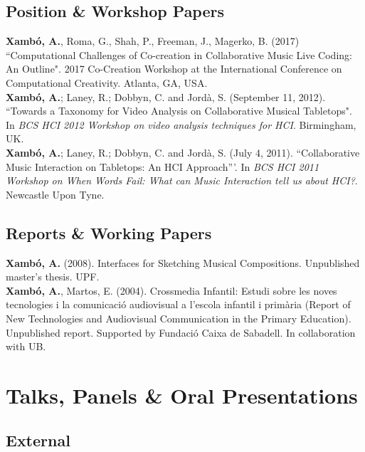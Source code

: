 \documentclass[10pt, a4paper]{article}
\newcommand{\years}[1]{\marginnote{\scriptsize #1}}
\begin{document}
\subsection*{Position \& Workshop Papers}
\noindent

\years{2017}\textbf{Xambó, A.}, Roma, G., Shah, P., Freeman, J., Magerko, B. (2017) “Computational Challenges of Co-creation in Collaborative Music Live Coding: An Outline". 2017 Co-Creation Workshop at the International Conference on Computational Creativity. Atlanta, GA, USA.\\ 
\years{2012}\textbf{Xambó, A.}; Laney, R.; Dobbyn, C. and Jordà, S. (September 11, 2012). “Towards a Taxonomy for Video Analysis on Collaborative Musical Tabletops". In \emph{BCS HCI 2012 Workshop on video analysis techniques for HCI}. Birmingham, UK.\\
\years{2011}\textbf{Xambó, A.}; Laney, R.; Dobbyn, C. and Jordà, S. (July 4, 2011). ``Collaborative Music Interaction on Tabletops: An HCI Approach'''. In \emph{BCS HCI 2011 Workshop on When Words Fail: What can Music Interaction tell us about HCI?}. Newcastle Upon Tyne.\\

\subsection*{Reports \& Working Papers}
\noindent

\years{2008}\textbf{Xambó, A.} (2008). Interfaces for Sketching Musical Compositions. Unpublished master's thesis. UPF.\\ 
\years{2004}\textbf{Xambó, A.}, Martos, E. (2004). Crossmedia Infantil: Estudi sobre les noves tecnologies i la comunicació audiovisual a l'escola infantil i primària (Report of New Technologies and Audiovisual Communication in the Primary Education). Unpublished report. Supported by Fundació Caixa de Sabadell. In collaboration with UB.\\

\section*{Talks, Panels \& Oral Presentations}
\noindent

\subsection*{External}
\noindent
\end{document}
